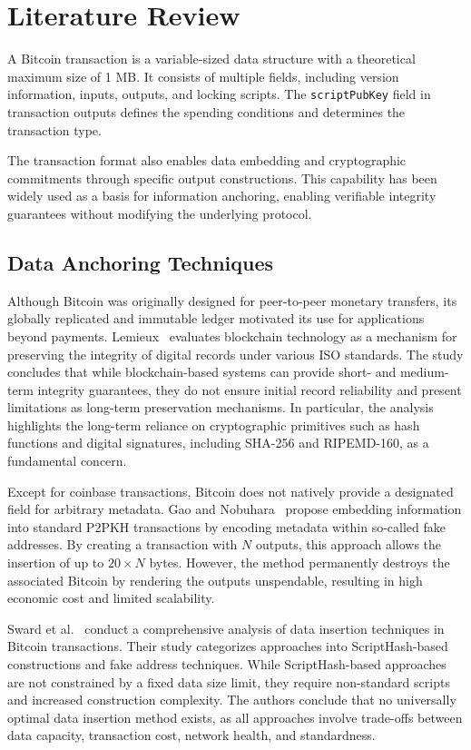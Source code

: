 \section{Literature Review}

A Bitcoin transaction is a variable-sized data structure with a theoretical maximum size of 1 MB.
It consists of multiple fields, including version information, inputs, outputs, and locking scripts.
The \texttt{scriptPubKey} field in transaction outputs defines the spending conditions and determines the transaction type.

The transaction format also enables data embedding and cryptographic commitments through specific output constructions.
This capability has been widely used as a basis for information anchoring, enabling verifiable integrity guarantees without modifying the underlying protocol.

\subsection{Data Anchoring Techniques}

Although Bitcoin was originally designed for peer-to-peer monetary transfers, its globally replicated and immutable ledger motivated its use for applications beyond payments.
Lemieux~\cite{Lemieux2016Trusting} evaluates blockchain technology as a mechanism for preserving the integrity of digital records under various ISO standards.
The study concludes that while blockchain-based systems can provide short- and medium-term integrity guarantees, they do not ensure initial record reliability and present limitations as long-term preservation mechanisms.
In particular, the analysis highlights the long-term reliance on cryptographic primitives such as hash functions and digital signatures, including SHA-256 and RIPEMD-160, as a fundamental concern.

Except for coinbase transactions, Bitcoin does not natively provide a designated field for arbitrary metadata.
Gao and Nobuhara~\cite{Gao2017Decentralized} propose embedding information into standard P2PKH transactions by encoding metadata within so-called fake addresses.
By creating a transaction with $N$ outputs, this approach allows the insertion of up to $20 \times N$ bytes.
However, the method permanently destroys the associated Bitcoin by rendering the outputs unspendable, resulting in high economic cost and limited scalability.

Sward et al.~\cite{Sward2018DataInsertion} conduct a comprehensive analysis of data insertion techniques in Bitcoin transactions.
Their study categorizes approaches into ScriptHash-based constructions and fake address techniques.
While ScriptHash-based approaches are not constrained by a fixed data size limit, they require non-standard scripts and increased construction complexity.
The authors conclude that no universally optimal data insertion method exists, as all approaches involve trade-offs between data capacity, transaction cost, network health, and standardness.

